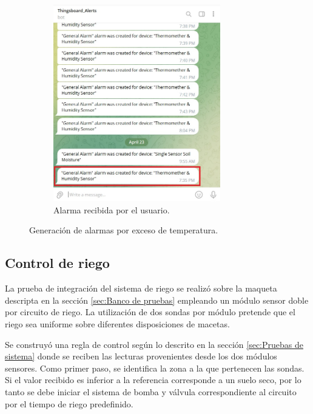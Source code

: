 \begin{figure}[!h]
\begin{subfigure}[b]{0.45\textwidth}
		\includegraphics[width=0.80\textwidth]{./Figures/chapter4/temp_user_alarm.jpg}
		\caption{Alarma recibida por el usuario.}
		\label{fig:temp_alarm_user}
     \end{subfigure}
     \hfill
        \caption[Generación de alarmas por exceso de temperatura]{Generación de alarmas por exceso de temperatura.}
        \label{fig:tb_clima_automation}
\end{figure}


\pagebreak
\subsection{Control de riego}
\label{sec:Control de riego}

La prueba de integración del sistema de riego se realizó sobre la maqueta descripta en la sección  \ref{sec:Banco de pruebas} empleando un módulo sensor doble por circuito de riego. La utilización de dos sondas por módulo pretende que el riego sea uniforme sobre diferentes disposiciones de macetas. 

Se construyó una regla de control según lo descrito en la sección \ref{sec:Pruebas de sistema} donde se reciben las lecturas provenientes desde los dos módulos sensores. Como primer paso, se identifica la zona a la que pertenecen las sondas. Si el valor recibido es inferior a la referencia corresponde a un suelo seco, por lo tanto se debe iniciar el sistema de bomba y válvula correspondiente al circuito por el tiempo de riego predefinido.


